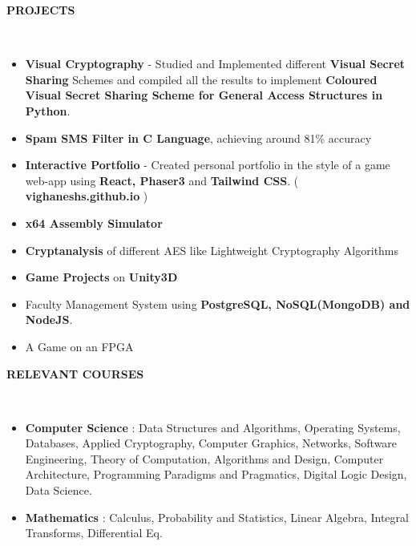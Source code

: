 \documentclass[a4paper,10pt]{article}
\newcommand{\lsep}{-0.6cm}
\newcommand{\resheading}[1]{{\small \colorbox{mygrey}{\begin{minipage}{0.975\textwidth}{\textbf{#1 \vphantom{p\^{E}}}}\end{minipage}}}}
\begin{document}
\resheading{\textbf{PROJECTS} }\\[\lsep]
\vspace{1.0pt}
\begin{itemize}
\setlength{\itemsep}{1pt}
\setlength{\parskip}{0pt}
\setlength{\parsep}{0pt}
\item \textbf{Visual Cryptography} - Studied and Implemented different \textbf{Visual Secret Sharing} Schemes and compiled all the results to implement \textbf{Coloured Visual Secret Sharing Scheme for General Access Structures in Python}. 	
\item \textbf{Spam SMS Filter in C Language}, achieving around 81\% accuracy
\item \textbf{Interactive Portfolio} - Created personal portfolio in the style of a game web-app using \textbf{React, Phaser3} and \textbf{Tailwind CSS}. (\textbf{ vighaneshs.github.io} )
\item \textbf{x64 Assembly Simulator}
\item \textbf{Cryptanalysis} of different AES like Lightweight Cryptography Algorithms
\item \textbf{Game Projects} on \textbf{Unity3D}
\item Faculty Management System using \textbf{PostgreSQL, NoSQL(MongoDB) and NodeJS}.
\item A Game on an FPGA
\end{itemize}
\vspace{-5pt}

\resheading{\textbf{RELEVANT COURSES} }\\[\lsep]
\vspace{1.0pt}
\begin{itemize}[itemsep=0.1pt]
\item \noindent \textbf{Computer Science} : Data Structures and Algorithms, Operating Systems, Databases, Applied Cryptography, Computer Graphics, Networks, Software Engineering, Theory of Computation,  Algorithms and Design, Computer Architecture,
Programming Paradigms and Pragmatics, Digital Logic Design, Data Science.
\item \noindent \textbf{Mathematics} : Calculus, Probability and Statistics, Linear Algebra, Integral Transforms, Differential Eq.
\end{itemize}
\end{document}
